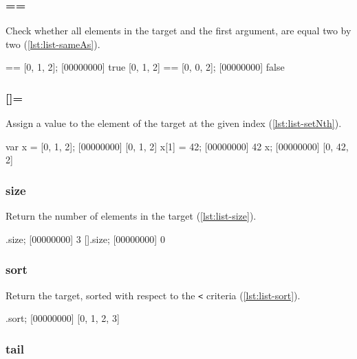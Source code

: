 \subsubsection{==}

Check whether all elements in the target and the first argument, are
equal two by two (\autoref{lst:list-sameAs}).

\begin{urbiscript}[caption={\lstinline|List.==|}, label=lst:list-sameAs]
[0, 1, 2] == [0, 1, 2];
[00000000] true
[0, 1, 2] == [0, 0, 2];
[00000000] false
\end{urbiscript}

\subsubsection{[]=}
\label{sec:std-list-setnth}

Assign a value to the element of the target at the given index
(\autoref{lst:list-setNth}).

\begin{urbiscript}[caption={\lstinline|List.'\[\]='|}, label=lst:list-setNth]
var x = [0, 1, 2];
[00000000] [0, 1, 2]
x[1] = 42;
[00000000] 42
x;
[00000000] [0, 42, 2]
\end{urbiscript}

\subsubsection{size}

Return the number of elements in the target (\autoref{lst:list-size}).

\begin{urbiscript}[caption=List.size, label=lst:list-size]
[1, 2, 3].size;
[00000000] 3
[].size;
[00000000] 0
\end{urbiscript}

\subsubsection{sort}

Return the target, sorted with respect to the \lstinline|<| criteria
(\autoref{lst:list-sort}).

\begin{urbiscript}[caption=List.sort, label=lst:list-sort]
[1, 0, 3, 2].sort;
[00000000] [0, 1, 2, 3]
\end{urbiscript}

\subsubsection{tail}

